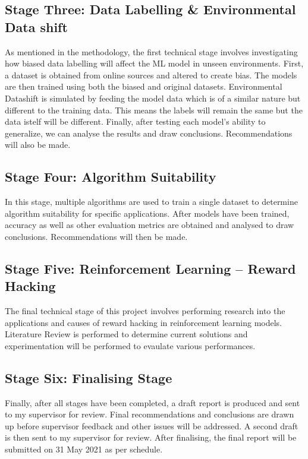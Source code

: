 \documentclass[a4paper,12pt]{report}
\begin{document}
\subsection{Stage Three: Data Labelling \& Environmental Data shift}
As mentioned in the methodology, the first technical stage involves investigating how biased data labelling will affect the ML model in unseen environments.  
First, a dataset is obtained from online sources and altered to create bias. The models are then trained using both the biased and original datasets. 
Environmental Datashift is simulated by feeding the model data which is of a similar nature but different to the training data. 
This means the labels will remain the same but the data istelf will be different. Finally, after testing each model's ability to generalize, we can analyse the results and draw conclusions.
Recommendations will also be made. 

\subsection{Stage Four: Algorithm Suitability}
In this stage, multiple algorithms are used to train a single dataset to determine algorithm suitability for specific applications.
After models have been trained, accuracy as well as other evaluation metrics are obtained and analysed to  draw conclusions. Recommendations will then be made.

\subsection{Stage Five: Reinforcement Learning – Reward Hacking}
The final technical stage of this project involves performing research into the applications and causes of reward hacking in reinforcement learning models. 
Literature Review is performed to determine current solutions and experimentation will be performed to evaulate various performances. 

\subsection{Stage Six: Finalising Stage}
Finally, after all stages have been completed, a draft report is produced and sent to my supervisor for review. 
Final recommendations and conclusions are drawn up before supervisor feedback and other issues will be addressed.
A second draft is then sent to my supervisor for review. After finalising, the final report will be submitted on 31 May 2021 as per schedule.
\end{document}
